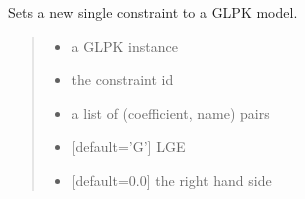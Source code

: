 \documentclass[letterpaper,12pt,english]{sphinxmanual}
\begin{document}
\begin{fulllineitems}
\label{\detokenize{api/solvers:cbmpy.CBGLPK.glpk_setSingleConstraint}}
\pysigstartsignatures
\pysiglinewithargsret
{}
{\sphinxparamcomma {}\sphinxparamcomma {}\sphinxparamcomma {}\sphinxparamcomma {}}
{}
\pysigstopsignatures
\sphinxAtStartPar
Sets a new single constraint to a GLPK model.
\begin{quote}\begin{description}
\begin{itemize}
\item {} 
\sphinxAtStartPar
{} \textendash{} a GLPK instance

\item {} 
\sphinxAtStartPar
{} \textendash{} the constraint id

\item {} 
\sphinxAtStartPar
{} \textendash{} a list of (coefficient, name) pairs

\item {} 
\sphinxAtStartPar
{} \textendash{} {[}default=’G’{]} LGE

\item {} 
\sphinxAtStartPar
{} \textendash{} {[}default=0.0{]} the right hand side

\end{itemize}

\end{description}\end{quote}

\end{fulllineitems}

\end{document}
